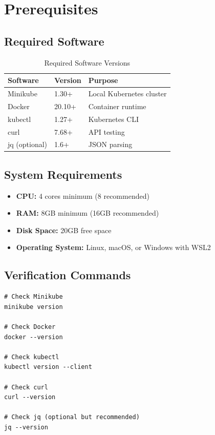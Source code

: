 \documentclass[12pt,a4paper]{article}
\begin{document}
\section{Prerequisites}

\subsection{Required Software}
\begin{table}[h]
\centering
\begin{tabular}{@{}lll@{}}
\toprule
\textbf{Software} & \textbf{Version} & \textbf{Purpose} \\
\midrule
Minikube & 1.30+ & Local Kubernetes cluster \\
Docker & 20.10+ & Container runtime \\
kubectl & 1.27+ & Kubernetes CLI \\
curl & 7.68+ & API testing \\
jq (optional) & 1.6+ & JSON parsing \\
\bottomrule
\end{tabular}
\caption{Required Software Versions}
\end{table}

\subsection{System Requirements}
\begin{itemize}
    \item \textbf{CPU:} 4 cores minimum (8 recommended)
    \item \textbf{RAM:} 8GB minimum (16GB recommended)
    \item \textbf{Disk Space:} 20GB free space
    \item \textbf{Operating System:} Linux, macOS, or Windows with WSL2
\end{itemize}

\subsection{Verification Commands}
\begin{lstlisting}[style=bash]
# Check Minikube
minikube version

# Check Docker
docker --version

# Check kubectl
kubectl version --client

# Check curl
curl --version

# Check jq (optional but recommended)
jq --version
\end{lstlisting}
\end{document}
